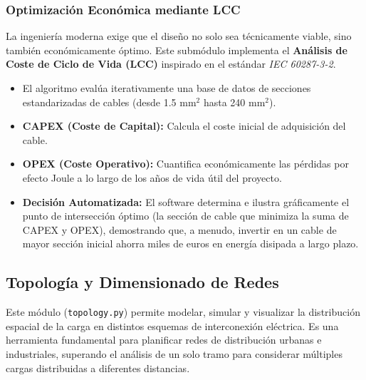 \documentclass[11pt,a4paper]{article}
\begin{document}
\subsubsection{Optimización Económica mediante LCC}
La ingeniería moderna exige que el diseño no solo sea técnicamente viable, sino también económicamente óptimo. Este submódulo implementa el \textbf{Análisis de Coste de Ciclo de Vida (LCC)} inspirado en el estándar \textit{IEC 60287-3-2}.
\begin{itemize}
    \item El algoritmo evalúa iterativamente una base de datos de secciones estandarizadas de cables (desde 1.5 mm$^2$ hasta 240 mm$^2$).
    \item \textbf{CAPEX (Coste de Capital):} Calcula el coste inicial de adquisición del cable.
    \item \textbf{OPEX (Coste Operativo):} Cuantifica económicamente las pérdidas por efecto Joule a lo largo de los años de vida útil del proyecto.
    \item \textbf{Decisión Automatizada:} El software determina e ilustra gráficamente el punto de intersección óptimo (la sección de cable que minimiza la suma de CAPEX y OPEX), demostrando que, a menudo, invertir en un cable de mayor sección inicial ahorra miles de euros en energía disipada a largo plazo.
\end{itemize}

\subsection{Topología y Dimensionado de Redes}
Este módulo (\texttt{topology.py}) permite modelar, simular y visualizar la distribución espacial de la carga en distintos esquemas de interconexión eléctrica. Es una herramienta fundamental para planificar redes de distribución urbanas e industriales, superando el análisis de un solo tramo para considerar múltiples cargas distribuidas a diferentes distancias.
\end{document}
